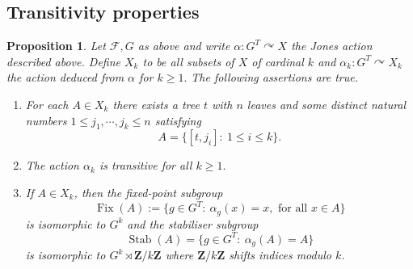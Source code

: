 \documentclass[a4paper, 12pt]{amsart}
\numberwithin{equation}{section}
\newtheorem{proposition}[theorem]{Proposition}
\theoremstyle{definition}
\newcommand{\act}{\curvearrowright}
\newcommand{\al}{\alpha}
\newcommand{\cF}{\mathcal F}
\DeclareMathOperator{\Fix}{Fix}
\DeclareMathOperator{\Stab}{Stab}
\newcommand{\Z}{\mathbf{Z}}
\begin{document}
\subsection{Transitivity properties}

\begin{proposition}\label{prop:Q-space}
Let $\cF,G$ as above and write $\al:G^T\act X$ the Jones action described above. 
Define $X_k$ to be all subsets of $X$ of cardinal $k$ and $\al_k:G^T\act X_k$ the action deduced from $\al$ for $k\geq 1.$
The following assertions are true.
\begin{enumerate}
\item For each $A\in X_k$ there exists a tree $t$ with $n$ leaves and some distinct natural numbers $1\leq j_1,\cdots,j_k\leq n$ satisfying $$A=\{ [t,j_i]:\ 1\leq i\leq k\}.$$
\item The action $\al_k$ is transitive for all $k\geq 1.$
\item If $A\in X_k$, then the fixed-point subgroup 
$$\Fix(A):=\{g\in G^T:\ \al_g(x)=x, \text{ for all } x\in A\}$$ 
is isomorphic to $G^k$ and the stabiliser subgroup 
$$\Stab(A)=\{g\in G^T:\ \al_g(A)=A\}$$ 
is isomorphic to $G^k\rtimes \Z/k\Z$ where $\Z/k\Z$ shifts indices modulo $k$.
\end{enumerate}
\end{proposition}
 
\end{document}
